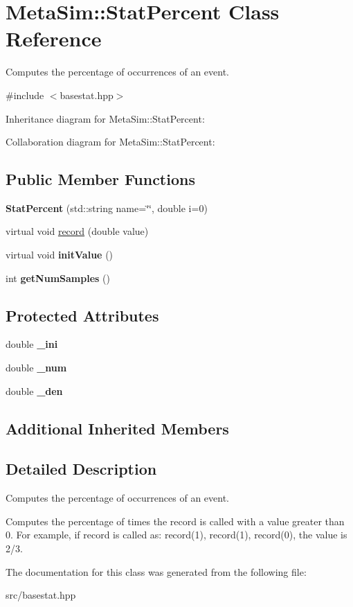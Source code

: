 \hypertarget{classMetaSim_1_1StatPercent}{}\section{Meta\+Sim\+:\+:Stat\+Percent Class Reference}
\label{classMetaSim_1_1StatPercent}


Computes the percentage of occurrences of an event.  




{\ttfamily \#include $<$basestat.\+hpp$>$}



Inheritance diagram for Meta\+Sim\+:\+:Stat\+Percent\+:


Collaboration diagram for Meta\+Sim\+:\+:Stat\+Percent\+:
\subsection*{Public Member Functions}
\begin{DoxyCompactItemize}
\item 
{\bfseries Stat\+Percent} (std\+::string name=\char`\"{}\char`\"{}, double i=0)
\item 
virtual void \hyperlink{group__metasim__stat_ga6fe4e2066cb72c9eb74c44d5e700cc86}{record} (double value)
\item 
virtual void {\bfseries init\+Value} ()
\item 
int {\bfseries get\+Num\+Samples} ()
\end{DoxyCompactItemize}
\subsection*{Protected Attributes}
\begin{DoxyCompactItemize}
\item 
double {\bfseries \+\_\+ini}
\item 
double {\bfseries \+\_\+num}
\item 
double {\bfseries \+\_\+den}
\end{DoxyCompactItemize}
\subsection*{Additional Inherited Members}


\subsection{Detailed Description}
Computes the percentage of occurrences of an event. 

Computes the percentage of times the record is called with a value greater than 0. For example, if record is called as\+: record(1), record(1), record(0), the value is 2/3. 

The documentation for this class was generated from the following file\+:\begin{DoxyCompactItemize}
\item 
src/basestat.\+hpp\end{DoxyCompactItemize}
